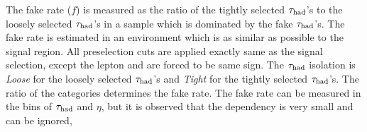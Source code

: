 The fake rate ($f$) is measured as the ratio of the tightly selected $\tau_{\rm had}$'s to the loosely 
selected $\tau_{\rm had}$'s in a sample which is dominated by the fake $\tau_{\rm had}$'s. The fake rate is estimated in an environment which is as 
similar as possible to the signal region. 
All preselection cuts are applied exactly same as the signal selection,  except the lepton and \Tau are forced to be same sign. 
The $\tau_{\rm had}$ isolation is {\it Loose} for the loosely selected $\tau_{\rm had}$'s and {\it Tight} for the tightly selected $\tau_{\rm had}$'s.
The ratio of the  categories determines the fake rate. 
The fake rate can be measured in the bins of $\tau_{\rm had}$ \pt and $\eta$, but it is observed that the dependency is very small and can be ignored, 
